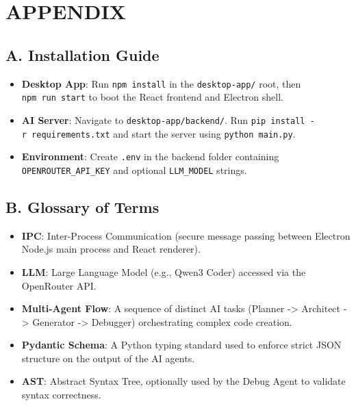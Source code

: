 \documentclass[
  12pt,
]{article}
\providecommand{\tightlist}{%
  \setlength{\itemsep}{0pt}\setlength{\parskip}{0pt}}
\begin{document}
\newpage

\section{APPENDIX}\label{appendix}

\subsection{A. Installation Guide}\label{a.-installation-guide}

\begin{itemize}
\tightlist
\item
  \textbf{Desktop App}: Run \texttt{npm\ install} in the
  \texttt{desktop-app/} root, then \texttt{npm\ run\ start} to boot the
  React frontend and Electron shell.
\item
  \textbf{AI Server}: Navigate to \texttt{desktop-app/backend/}. Run
  \texttt{pip\ install\ -r\ requirements.txt} and start the server using
  \texttt{python\ main.py}.
\item
  \textbf{Environment}: Create \texttt{.env} in the backend folder
  containing \texttt{OPENROUTER\_API\_KEY} and optional
  \texttt{LLM\_MODEL} strings.
\end{itemize}

\subsection{B. Glossary of Terms}\label{b.-glossary-of-terms}

\begin{itemize}
\tightlist
\item
  \textbf{IPC}: Inter-Process Communication (secure message passing
  between Electron Node.js main process and React renderer).
\item
  \textbf{LLM}: Large Language Model (e.g., Qwen3 Coder) accessed via
  the OpenRouter API.
\item
  \textbf{Multi-Agent Flow}: A sequence of distinct AI tasks (Planner
  -\textgreater{} Architect -\textgreater{} Generator -\textgreater{}
  Debugger) orchestrating complex code creation.
\item
  \textbf{Pydantic Schema}: A Python typing standard used to enforce
  strict JSON structure on the output of the AI agents.
\item
  \textbf{AST}: Abstract Syntax Tree, optionally used by the Debug Agent
  to validate syntax correctness.
\end{itemize}
\end{document}
